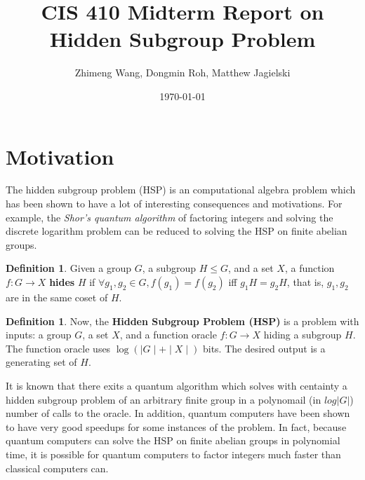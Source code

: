 \documentclass[dvips,12pt]{article}
\theoremstyle{plain}
\theoremstyle{definition}
\newtheorem{defn}[thm]{Definition} %
\begin{document}

\title{CIS 410 Midterm Report on Hidden Subgroup Problem}
\author{Zhimeng Wang, Dongmin Roh, Matthew Jagielski}
\date{\today}



\maketitle


\section{Motivation}

The hidden subgroup problem (HSP) is an computational algebra problem which has been shown to have a lot of interesting consequences and motivations. For example, the \emph{Shor's quantum algorithm} of factoring integers and solving the discrete logarithm problem can be reduced to solving the HSP on finite abelian groups.

\begin{defn}
Given a group $G$, a subgroup $H\le G$, and a set $X$, a function $f:G\rightarrow X$ \textbf{hides} $H$ if $\forall g_1,g_2\in G, f(g_1)=f(g_2)$ iff $g_1H=g_2H$, that is, $g_1,g_2$ are in the same coset of $H$.
\end{defn}

\begin{defn}
Now, the \textbf{Hidden Subgroup Problem (HSP)} is a problem with inputs: a group $G$, a set $X$, and a function oracle $f: G\rightarrow X$ hiding a subgroup $H$. The function oracle uses $\log(\mid G\mid + \mid X\mid)$ bits. The desired output is a generating set of $H$.
\end{defn}

It is known that there exits a quantum algorithm which solves with centainty a hidden subgroup problem of an arbitrary finite group in a polynomail (in $log|G|$) number of calls to the oracle. In addition, quantum computers have been shown to have very good speedups for some instances of the problem. In fact, because quantum computers can solve the HSP on finite abelian groups in polynomial time, it is possible for quantum computers to factor integers much faster than classical computers can.\\
\end{document}

